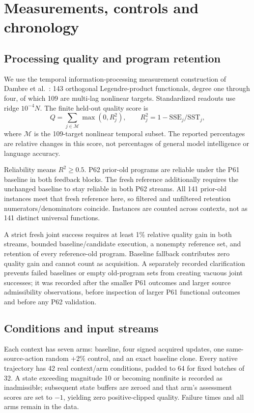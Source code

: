 \documentclass[11pt]{article}
\begin{document}
\section{Measurements, controls and chronology}
\subsection{Processing quality and program retention}
We use the temporal information-processing measurement construction of Dambre et al.~\cite{dambre}: 143 orthogonal Legendre-product functionals, degree one through four, of which 109 are multi-lag nonlinear targets. Standardized readouts use ridge $10^{-4}N$. The finite held-out quality score is
\begin{equation}
 Q=\sum_{j\in\mathcal M}\max(0,R_j^2),\qquad
 R_j^2=1-\mathrm{SSE}_j/\mathrm{SST}_j,
\end{equation}
where $\mathcal M$ is the 109-target nonlinear temporal subset. The reported percentages are relative changes in this score, not percentages of general model intelligence or language accuracy.

Reliability means $R^2\geq0.5$. P62 prior-old programs are reliable under the P61 baseline in both feedback blocks. The fresh reference additionally requires the unchanged baseline to stay reliable in both P62 streams. All 141 prior-old instances meet that fresh reference here, so filtered and unfiltered retention numerators/denominators coincide. Instances are counted across contexts, not as 141 distinct universal functions.

A strict fresh joint success requires at least 1\% relative quality gain in both streams, bounded baseline/candidate execution, a nonempty reference set, and retention of every reference-old program. Baseline fallback contributes zero quality gain and cannot count as acquisition. A separately recorded clarification prevents failed baselines or empty old-program sets from creating vacuous joint successes; it was recorded after the smaller P61 outcomes and larger source admissibility observations, before inspection of larger P61 functional outcomes and before any P62 validation.

\subsection{Conditions and input streams}
Each context has seven arms: baseline, four signed acquired updates, one same-source-action random $+2\%$ control, and an exact baseline clone. Every native trajectory has 42 real context/arm conditions, padded to 64 for fixed batches of 32. A state exceeding magnitude 10 or becoming nonfinite is recorded as inadmissible; subsequent state buffers are zeroed and that arm's assessment scores are set to $-1$, yielding zero positive-clipped quality. Failure times and all arms remain in the data.
\end{document}
